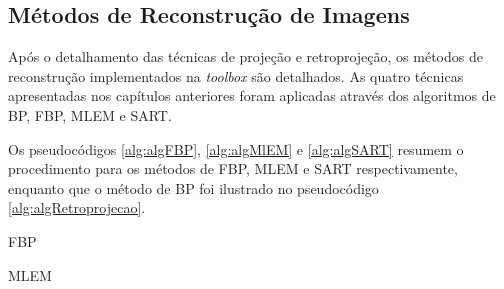 \subsection{Métodos de Reconstrução de Imagens} 

Após o detalhamento das técnicas de projeção e retroprojeção, os métodos de reconstrução implementados na \textit{toolbox} são detalhados. As quatro técnicas apresentadas nos capítulos anteriores foram aplicadas através dos algoritmos de \acs{BP}, \acs{FBP}, \acs{MLEM} e \acs{SART}. 

Os pseudocódigos \ref{alg:algFBP}, \ref{alg:algMlEM} e \ref{alg:algSART} resumem o procedimento para os métodos de \acs{FBP}, \acs{MLEM} e \acs{SART} respectivamente, enquanto que o método de \acs{BP} foi ilustrado no pseudocódigo \ref{alg:algRetroprojecao}.  

\begin{algorithm}[htb]
	\caption{\acs{FBP}}
	\label{alg:algFBP}
\end{algorithm}

\begin{algorithm}[htb]
	\caption{\acs{MLEM}}
	\label{alg:algMlEM}
\end{algorithm}

